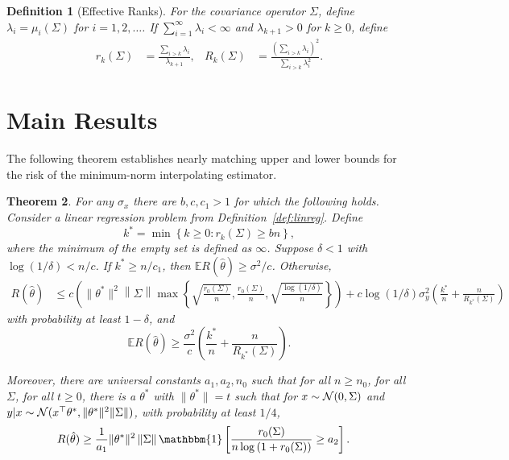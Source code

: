 \documentclass[11pt,notitlepage]{article}
\newcommand\E {\mathbb{E}}
\newcommand\Expect{\E}
\newcommand\ind {\mathbbm{1}}
\newtheorem{theorem}{Theorem}
\newtheorem{definition}[theorem]{Definition}
\begin{document}
\begin{definition}[Effective Ranks]\label{def:ranks}
For the covariance operator $\Sigma$,
define $\lambda_i=\mu_i(\Sigma)$ for $i=1,2,\ldots$.
If $\sum_{i=1}^\infty\lambda_i<\infty$ and $\lambda_{k+1}>0$
for $k\ge 0$, define
  \begin{align*}
    r_k(\Sigma) & = \frac{\sum_{i>k}\lambda_i}{\lambda_{k+1}}, &
    R_k(\Sigma) & = \frac{\left(\sum_{i>k}\lambda_i\right)^2}
        {\sum_{i>k}\lambda_i^2}.
  \end{align*}
\end{definition}

\section{Main Results}\label{section:results}

The following theorem establishes nearly matching upper and lower
bounds for the risk of the minimum-norm interpolating estimator.

\begin{theorem}\label{th::main}
 For any $\sigma_x$ there are  $b,c, c_1>1$ for which the following
 holds. Consider a linear regression problem from
 Definition~\ref{def:linreg}. Define
   \[
     k^* = \min\left\{k\ge 0: r_k(\Sigma)\ge bn\right\},
   \]
 where the minimum of the empty set is defined as $\infty$.
 Suppose $\delta<1$ with $\log(1/\delta)<n/c$.
 If $k^* \geq n/c_1$, then
 $\Expect R(\hat\theta)\ge \sigma^2/c$.
 Otherwise,
   \begin{align*}
     R(\hat\theta)
       & \le c\left(
         \|\theta^\ast\|^2\left\|\Sigma\right\|
         \max\left\{\sqrt{\frac{r_0(\Sigma)}{n}},
         \frac{r_0(\Sigma)}{n}, \sqrt{\frac{\log(1/\delta)}{n}}
         \right\}\right) 
         {} + c\log(1/\delta)\sigma^2_y\left(\frac{k^*}{n}
         + \frac{n}{R_{k^*}(\Sigma)}\right)
   \end{align*}
 with probability at least $1-\delta$, and
   \[
     \Expect R(\hat\theta)\ge \frac{\sigma^2}{c}
       \left(\frac{k^*}{n} + \frac{n}{R_{k^*}(\Sigma)}\right).
   \]

Moreover, there are universal constants $a_1,a_2,n_0$
such that
for all $n \geq n_0$, for all $\Sigma$, 
for all $t \geq 0$, there is
a $\theta^*$ with 
$\| \theta^* \| = t$ such that for $x\sim{\cal N}(0,\Sigma)$ and
$y|x\sim{\cal N}(x^\top\theta^*,\| \theta^* \|^2 \| \Sigma \|)$, with probability at least $1/4$,
  \begin{align*}
    R(\hat\theta)
      & \ge \frac{1}{a_1}
        \|\theta^\ast\|^2\left\|\Sigma\right\|
        \ind\left[\frac{r_0(\Sigma)}{n
        \log\left(1+r_0(\Sigma)\right)}\ge a_2\right].
    \end{align*}
\end{theorem}
\end{document}
